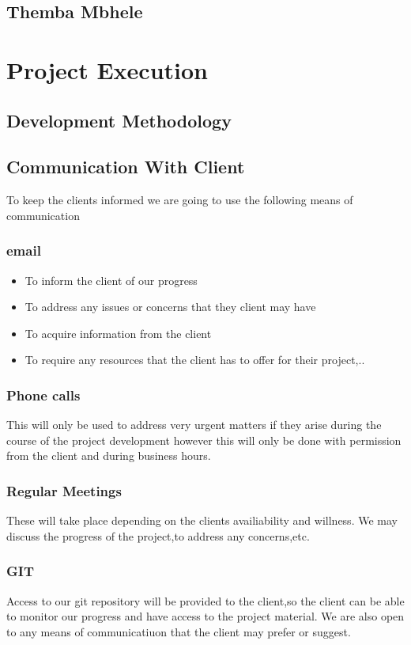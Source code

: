 \documentclass{scrartcl}
\begin{document}
\subsection{Themba Mbhele}
\section{Project Execution}
\subsection{Development Methodology}
\subsection{Communication With Client}
To keep the clients informed we are going to use the following means of communication
\subsubsection{email}
\begin{itemize}
\item To inform the client of our progress
\item To address any issues or concerns that they client may have
\item To acquire information from the client
\item To require any resources that the client has to offer for their project,..
\end{itemize}
\subsubsection{Phone calls}
This will only be used to address very urgent matters if they arise during the course of the project development
however this will only be done with permission from the client and during business hours.
\subsubsection{Regular Meetings}
These will take place depending on the clients availiability and willness.
We may discuss the progress of the project,to address any concerns,etc.
\subsubsection{GIT}
Access to our git repository will be provided to the client,so the client can be able to monitor
our progress and have access to the project material.
We are also open to any means of communicatiuon that the client may prefer or suggest.
\end{document}
